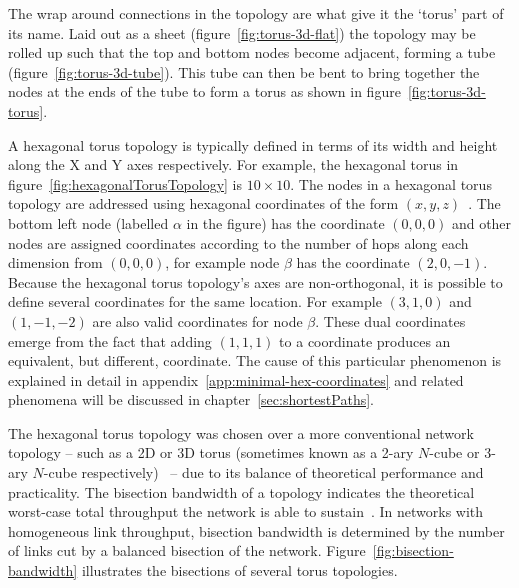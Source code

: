 		The wrap around connections in the topology are what give it the `torus'
		part of its name. Laid out as a sheet (figure~\ref{fig:torus-3d-flat}) the
		topology may be rolled up such that the top and bottom nodes become
		adjacent, forming a tube (figure~\ref{fig:torus-3d-tube}). This tube can
		then be bent to bring together the nodes at the ends of the tube to form a
		torus as shown in figure~\ref{fig:torus-3d-torus}.
		
		A hexagonal torus topology is typically defined in terms of its width and
		height along the X and Y axes respectively. For example, the hexagonal
		torus in figure~\ref{fig:hexagonalTorusTopology} is $10\times10$.  The
		nodes in a hexagonal torus topology are addressed using hexagonal
		coordinates of the form $(x, y, z)$~\cite{patel15}. The bottom left node
		(labelled $\alpha$ in the figure) has the coordinate $(0, 0, 0)$ and other
		nodes are assigned coordinates according to the number of hops along each
		dimension from $(0, 0, 0)$, for example node $\beta$ has the coordinate
		$(2, 0, -1)$. Because the hexagonal torus topology's axes are
		non-orthogonal, it is possible to define several coordinates for the same
		location. For example $(3, 1, 0)$ and $(1, -1, -2)$ are also valid
		coordinates for node $\beta$. These dual coordinates emerge from the fact
		that adding $(1, 1, 1)$ to a coordinate produces an equivalent, but
		different, coordinate. The cause of this particular phenomenon is explained
		in detail in appendix~\ref{app:minimal-hex-coordinates} and related
		phenomena will be discussed in chapter~\ref{sec:shortestPaths}.
		
		The hexagonal torus topology was chosen over a more conventional network
		topology -- such as a 2D or 3D torus (sometimes known as a 2-ary $N$-cube
		or 3-ary $N$-cube respectively)~\cite[chapters~3~and~5]{dally04} -- due to
		its balance of theoretical performance and practicality. The bisection
		bandwidth of a topology indicates the theoretical worst-case total
		throughput the network is able to sustain~\cite[chapter~1]{dally04}.  In
		networks with homogeneous link throughput, bisection bandwidth is
		determined by the number of links cut by a balanced bisection of the
		network.  Figure~\ref{fig:bisection-bandwidth} illustrates the bisections
		of several torus topologies.
		

